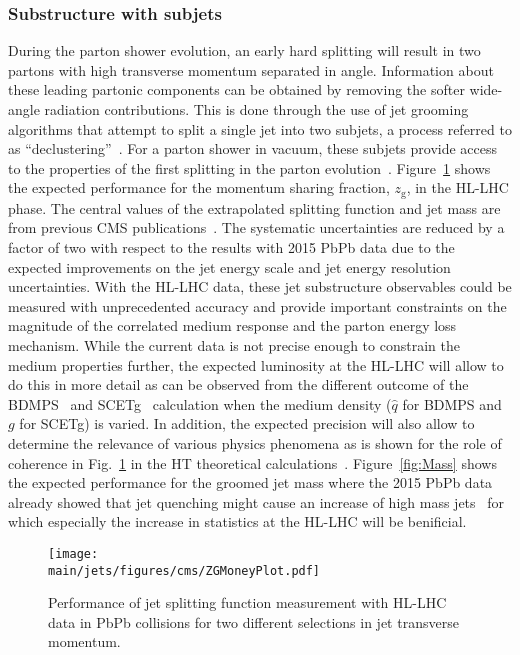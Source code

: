\newpage
\subsubsection{Substructure with subjets}
During the parton shower evolution, an early hard splitting will result in two partons with high transverse momentum separated in angle. Information about these leading partonic components can be obtained by removing the softer wide-angle radiation contributions. This is done through the use of jet grooming algorithms that attempt to split a single jet into two subjets, a process referred to as ``declustering''~\cite{Ellis:2009me,Butterworth:2008iy,Krohn:2009th,Dasgupta:2013ihk,Larkoski:2014wba}. For a parton shower in vacuum, these subjets provide access to the properties of the first splitting in the parton evolution~\cite{Altarelli:1977zs,Larkoski:2015lea}. Figure~\ref{fig:ZG} shows the expected performance for the momentum sharing fraction, $z_{\mathrm{g}}$, in the HL-LHC phase. The central values of the extrapolated splitting function and jet mass are from previous CMS publications~\cite{Sirunyan:2017bsd,Sirunyan:2018gct}. The systematic uncertainties are reduced by a factor of two with respect to the results with 2015 PbPb data due to the expected improvements on the jet energy scale and jet energy resolution uncertainties. With the HL-LHC data, these jet substructure observables could be measured with unprecedented accuracy and provide important constraints on the magnitude of the correlated medium response and the parton energy loss mechanism. While the current data is not precise enough to constrain the medium properties further, the expected luminosity at the HL-LHC will allow to do this in more detail as can be observed from the different outcome of the BDMPS~\cite{Mehtar-Tani:2016aco} and SCETg~\cite{Chien:2016led} calculation when the medium density ($\hat{q}$ for BDMPS and $g$ for SCETg) is varied. In addition, the expected precision will also allow to determine the relevance of various physics phenomena as is shown for the role of coherence in Fig.~\ref{fig:ZG} in the HT theoretical calculations~\cite{Chang:2017gkt}. Figure~\ref{fig:Mass} shows the expected performance for the groomed jet mass where the 2015 PbPb data already showed that jet quenching might cause an increase of high mass jets~\cite{Sirunyan:2018gct} for which especially the increase in statistics at the HL-LHC will be benificial.
\begin{figure}[!h]
\begin{center}
\texttt{[image: \\main/jets/figures/cms/ZGMoneyPlot.pdf]}
\caption{Performance of jet splitting function measurement with HL-LHC data in PbPb collisions for two different selections in jet transverse momentum.~\cite{CMS-FTR-17-002:2017dec}}
\label{fig:ZG}
\end{center}
\end{figure}
